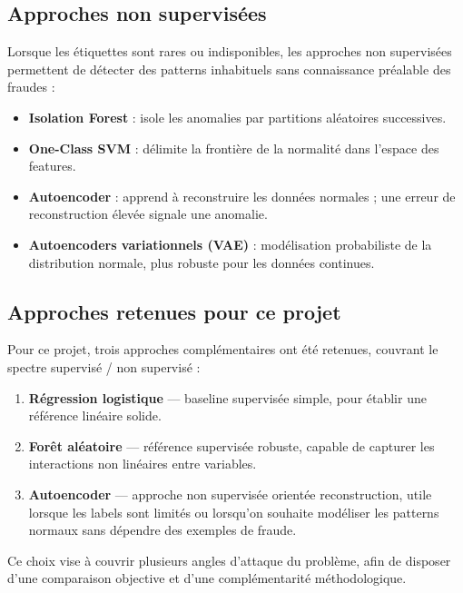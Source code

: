 \subsection{Approches non supervisées}

Lorsque les étiquettes sont rares ou indisponibles, les approches non supervisées
permettent de détecter des patterns inhabituels sans connaissance préalable des fraudes :

\begin{itemize}
  \item \textbf{Isolation Forest} : isole les anomalies par partitions aléatoires
    successives.
  \item \textbf{One-Class SVM} : délimite la frontière de la normalité dans l'espace
    des features.
  \item \textbf{Autoencoder} : apprend à reconstruire les données normales ; une erreur
    de reconstruction élevée signale une anomalie.
  \item \textbf{Autoencoders variationnels (VAE)} : modélisation probabiliste de la
    distribution normale, plus robuste pour les données continues.
\end{itemize}

\subsection{Approches retenues pour ce projet}

Pour ce projet, trois approches complémentaires ont été retenues, couvrant le spectre
supervisé / non supervisé :

\begin{enumerate}
  \item \textbf{Régression logistique} --- baseline supervisée simple, pour établir
    une référence linéaire solide.
  \item \textbf{Forêt aléatoire} --- référence supervisée robuste, capable de capturer
    les interactions non linéaires entre variables.
  \item \textbf{Autoencoder} --- approche non supervisée orientée reconstruction, utile
    lorsque les labels sont limités ou lorsqu'on souhaite modéliser les patterns normaux
    sans dépendre des exemples de fraude.
\end{enumerate}

Ce choix vise à couvrir plusieurs angles d'attaque du problème, afin de disposer d'une
comparaison objective et d'une complémentarité méthodologique.


